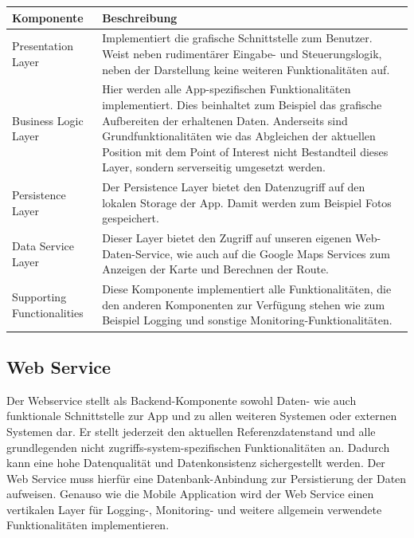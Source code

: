 \documentclass[a4paper,10pt,xetex]{article}
\begin{document}
\begin{longtabu} to \textwidth { | l | X[l] | }
\hline
\textbf{Komponente} & \textbf{Beschreibung} \\\hline
\endhead

Presentation Layer & Implementiert die grafische Schnittstelle zum Benutzer. Weist neben
rudimentärer Eingabe- und Steuerungslogik, neben der Darstellung keine
weiteren Funktionalitäten auf.\\\hline

Business Logic Layer & Hier werden alle App-spezifischen Funktionalitäten implementiert. Dies
beinhaltet zum Beispiel das grafische Aufbereiten der erhaltenen Daten.
Anderseits sind Grundfunktionalitäten wie das Abgleichen der aktuellen
Position mit dem Point of Interest nicht Bestandteil dieses Layer,
sondern serverseitig umgesetzt werden.\\\hline

Persistence Layer & Der Persistence Layer bietet den Datenzugriff auf den lokalen Storage
der App. Damit werden zum Beispiel Fotos gespeichert.\\\hline

Data Service Layer & Dieser Layer bietet den Zugriff auf unseren eigenen Web-Daten-Service,
wie auch auf die Google Maps Services zum Anzeigen der Karte und
Berechnen der Route.\\\hline

Supporting Functionalities & Diese Komponente implementiert alle Funktionalitäten, die den anderen
Komponenten zur Verfügung stehen wie zum Beispiel Logging und sonstige
Monitoring-Funktionalitäten.\\\hline
\end{longtabu}


\subsection{Web Service}\label{web-service}
Der Webservice stellt als Backend-Komponente
sowohl Daten- wie auch funktionale Schnittstelle zur App und zu allen
weiteren Systemen oder externen Systemen dar. Er stellt jederzeit den
aktuellen Referenzdatenstand und alle grundlegenden nicht
zugriffs-system-spezifischen Funktionalitäten an. Dadurch kann eine hohe
Datenqualität und Datenkonsistenz sichergestellt werden. Der Web Service
muss hierfür eine Datenbank-Anbindung zur Persistierung der Daten
aufweisen. Genauso wie die Mobile Application wird der Web Service einen
vertikalen Layer für Logging-, Monitoring- und weitere allgemein
verwendete Funktionalitäten implementieren.
\end{document}

